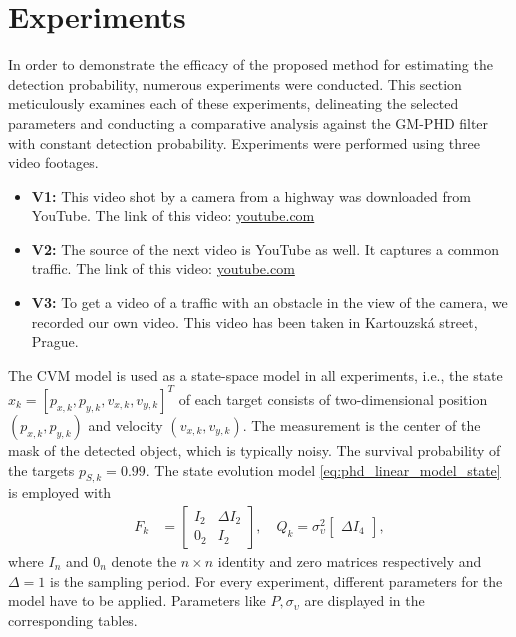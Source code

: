\chapter{Experiments}
\label{sec:experiments}
In order to demonstrate the efficacy of the proposed method for estimating the detection probability, numerous experiments were conducted. This section meticulously exa\-mines each of these experiments, delineating the selected parameters and conducting a comparative analysis against the GM-PHD filter with constant detection probability.
Experiments were performed using three video footages.
\begin{itemize}
  \item \textbf{V1:} This video shot by a camera from a highway was downloaded from YouTube. The link of this video: \href{https://www.youtube.com/watch?v=KBsqQez-O4w&t=30s&ab_channel=NickMartinez}{youtube.com}
  \item \textbf{V2:} The source of the next video is YouTube as well. It captures a common traffic. The link of this
  video: \href{https://www.youtube.com/watch?v=7WFYiZersNc&ab_channel=AbdulMunaim}{youtube.com}
  \item \textbf{V3:} To get a video of a traffic with an obstacle in the view of the camera, we recorded our own video. This video has been taken in Kartouzská street, Prague.
\end{itemize}
 The CVM model is used as a state-space model in all experiments, i.e., the state $x_k = [p_{x
,k},
p_{y
,k},v_{x
,k},v_{y,
k}]^T$ of each target consists of two-dimensional position $(p_{x,k},p_{y,k})$ and velocity $(v_{x,k},v_{y,k})$. The measurement is the center of the mask of the detected object, which is typically noisy. The survival probability of the targets $p_{S,k} = 0.99$. The state evolution model \eqref{eq:phd_linear_model_state} is employed with
\begin{align}
  F_k &=
  \begin{bmatrix}
    I_2 & \Delta I_2 \\
    0_2 & I_2
  \end{bmatrix},
  \quad
  Q_k = \sigma_{\upsilon}^2
  \begin{bmatrix}
    \Delta I_4
  \end{bmatrix},
\end{align}
where $I_n$ and $0_n$ denote the $n\times n$ identity and zero matrices respectively and $\Delta = 1$ is the sampling
period. For every experiment, different parameters for the model have to be applied. Parameters like $P, \sigma_{\upsilon}$
are displayed in the corresponding tables.

